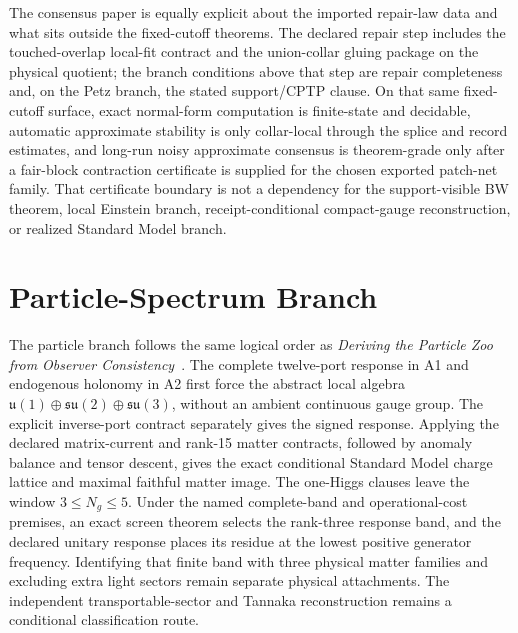 The consensus paper is equally explicit about the imported repair-law data and what sits
outside the fixed-cutoff theorems. The declared repair step includes the
touched-overlap local-fit contract and the union-collar gluing package on the physical quotient;
the branch conditions above that step are repair completeness and, on the Petz branch, the stated
support/CPTP clause. On that same fixed-cutoff surface, exact normal-form computation is
finite-state and decidable, automatic approximate stability is only collar-local through the
splice and record estimates, and long-run noisy approximate consensus is theorem-grade only after
a fair-block contraction certificate is supplied for the chosen exported patch-net family. That
certificate boundary is not a dependency for the support-visible BW theorem, local Einstein
branch, receipt-conditional compact-gauge reconstruction, or realized Standard Model branch.

\section{Particle-Spectrum Branch}

The particle branch follows the same logical order as
\emph{Deriving the Particle Zoo from Observer Consistency}~\cite{ophparticles}.
The complete twelve-port response in A1 and endogenous holonomy in A2 first
force the abstract local algebra
\(\mathfrak u(1)\oplus\mathfrak{su}(2)\oplus\mathfrak{su}(3)\), without an
ambient continuous gauge group. The explicit inverse-port contract separately
gives the signed response. Applying the declared matrix-current and rank-15
matter contracts, followed by anomaly balance and tensor descent, gives the
exact conditional Standard Model charge lattice and maximal faithful matter image. The
one-Higgs clauses leave the window \(3\le N_g\le5\). Under the named
complete-band and operational-cost premises, an exact screen theorem selects
the rank-three response band, and the declared unitary response places its
residue at the lowest positive generator frequency. Identifying that finite
band with three physical matter families and excluding extra light sectors
remain separate physical attachments. The independent transportable-sector
and Tannaka reconstruction remains a conditional classification route.

